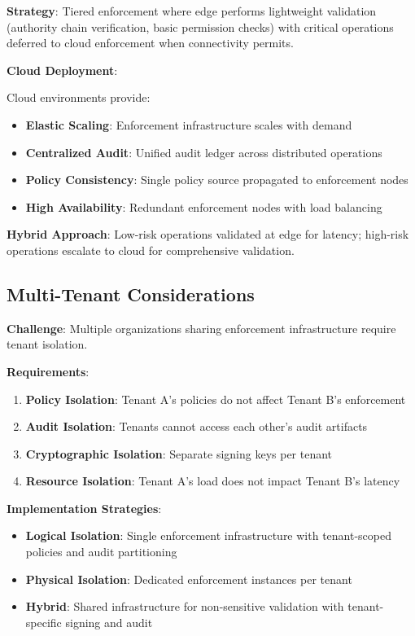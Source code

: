 \documentclass[11pt,letterpaper]{article}
\begin{document}
\textbf{Strategy}: Tiered enforcement where edge performs lightweight validation (authority chain verification, basic permission checks) with critical operations deferred to cloud enforcement when connectivity permits.

\textbf{Cloud Deployment}:

Cloud environments provide:
\begin{itemize}
\item \textbf{Elastic Scaling}: Enforcement infrastructure scales with demand
\item \textbf{Centralized Audit}: Unified audit ledger across distributed operations
\item \textbf{Policy Consistency}: Single policy source propagated to enforcement nodes
\item \textbf{High Availability}: Redundant enforcement nodes with load balancing
\end{itemize}

\textbf{Hybrid Approach}: Low-risk operations validated at edge for latency; high-risk operations escalate to cloud for comprehensive validation.

\subsection{Multi-Tenant Considerations}

\textbf{Challenge}: Multiple organizations sharing enforcement infrastructure require tenant isolation.

\textbf{Requirements}:
\begin{enumerate}
\item \textbf{Policy Isolation}: Tenant A's policies do not affect Tenant B's enforcement
\item \textbf{Audit Isolation}: Tenants cannot access each other's audit artifacts
\item \textbf{Cryptographic Isolation}: Separate signing keys per tenant
\item \textbf{Resource Isolation}: Tenant A's load does not impact Tenant B's latency
\end{enumerate}

\textbf{Implementation Strategies}:

\begin{itemize}
\item \textbf{Logical Isolation}: Single enforcement infrastructure with tenant-scoped policies and audit partitioning
\item \textbf{Physical Isolation}: Dedicated enforcement instances per tenant
\item \textbf{Hybrid}: Shared infrastructure for non-sensitive validation with tenant-specific signing and audit
\end{itemize}
\end{document}
